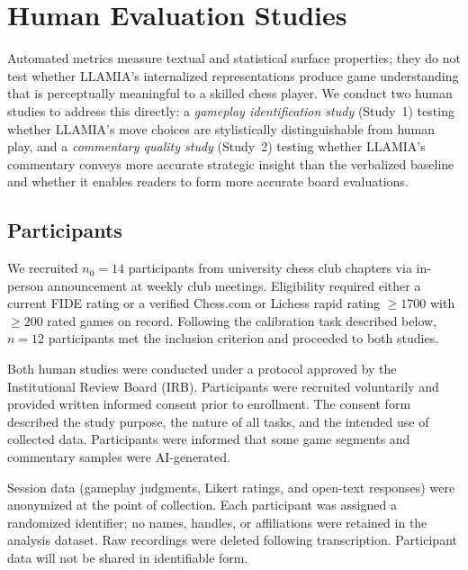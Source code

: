 \section{Human Evaluation Studies}
\label{sec:app_human}

Automated metrics measure textual and statistical surface properties; they do not test whether LLAMIA's internalized representations produce game understanding that is perceptually meaningful to a skilled chess player. We conduct two human studies to address this directly: a \emph{gameplay identification study} (Study~1) testing whether LLAMIA's move choices are stylistically distinguishable from human play, and a \emph{commentary quality study} (Study~2) testing whether LLAMIA's commentary conveys more accurate strategic insight than the verbalized baseline and whether it enables readers to form more accurate board evaluations.

\subsection{Participants}
\label{sec:app_human_participants}

We recruited $n_0 = 14$ participants from university chess club chapters via in-person announcement at weekly club meetings. Eligibility required either a current FIDE rating or a verified Chess.com or Lichess rapid rating $\geq 1700$ with $\geq 200$ rated games on record.  Following the calibration task described below, $n = 12$ participants met the inclusion criterion and proceeded to both studies.

Both human studies were conducted under a protocol approved by the Institutional Review Board (IRB).
Participants were recruited voluntarily and provided written informed consent prior to enrollment. The consent form described the study purpose, the nature of all tasks,  and the intended use of collected data. Participants were informed that some game segments and commentary samples were AI-generated.

Session data (gameplay judgments, Likert ratings, and open-text responses) were anonymized at the point of collection. Each participant was assigned a randomized identifier; no names, handles, or affiliations were retained in the analysis dataset. Raw recordings were deleted following transcription. Participant data will not be shared in identifiable form.

